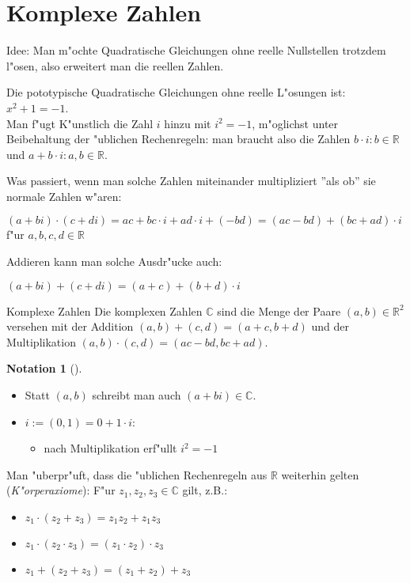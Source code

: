 \documentclass[11pt]{article}
\theoremstyle{remark}
\theoremstyle{definition}
\newtheorem*{notation}{Notation}
\theoremstyle{remark}
\begin{document}
\section{Komplexe Zahlen}
\label{sec:org73b0a26}
Idee: Man m"ochte Quadratische Gleichungen ohne reelle Nullstellen trotzdem
l"osen, also erweitert man die reellen Zahlen.

\begin{relation}
Die pototypische Quadratische Gleichungen ohne reelle L"osungen ist: \(x^2+1 =
-1\).\\
Man f"ugt K"unstlich die Zahl \(i\) hinzu mit \(i^2=-1\), m"oglichst unter
Beibehaltung der "ublichen Rechenregeln: man braucht also die Zahlen \(b\cdot i :
b\in \mathbb{R}\) und \(a+b\cdot i :  a,b\in \mathbb{R}\).
\end{relation}

Was passiert, wenn man solche Zahlen miteinander multipliziert ''als ob'' sie
normale Zahlen w"aren: 
\begin{relation}
\((a+bi)\cdot(c+di)=ac+bc\cdot i+ad\cdot i+(-bd)=(ac-bd)+(bc+ad)\cdot i\) f"ur \(a,b,c,d\in \mathbb{R}\)
\end{relation}

Addieren kann man solche Ausdr"ucke auch:
\begin{relation}
\((a+bi)+(c+di)=(a+c)+(b+d)\cdot i\)
\end{relation}

\begin{definition}{Komplexe Zahlen}{}
Die komplexen Zahlen \(\mathbb{C}\) sind die Menge der Paare \((a,b)\in
\mathbb{R}^2\) versehen mit der Addition \((a,b)+(c,d)=(a+c,b+d)\) und der
Multiplikation \((a,b)\cdot (c,d)=(ac-bd, bc+ad)\).
\end{definition}

\begin{notation}[] \label{} \
\begin{itemize}
\item Statt \((a,b)\) schreibt man auch \((a+bi)\in \mathbb{C}\).
\item \(i:=(0,1)=0+1\cdot i\):
\begin{itemize}
\item nach Multiplikation erf"ullt \(i^2=-1\)
\end{itemize}
\end{itemize}
\end{notation}

Man "uberpr"uft, dass die "ublichen Rechenregeln aus \(\mathbb{R}\) weiterhin
gelten (\emph{K"orperaxiome}): F"ur \(z_1, z_2, z_3 \in \mathbb{C}\) gilt, z.B.:
\begin{relation}
\begin{itemize}
\item \(z_1\cdot (z_2+z_3)=z_1z_2+z_1z_3\)
\item \(z_1\cdot (z_2\cdot z_3)=(z_1\cdot z_2)\cdot z_3\)
\item \(z_1 + (z_2 + z_3)=(z_1 + z_2) + z_3\)
\end{itemize}
\end{relation}
\end{document}
